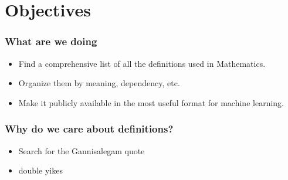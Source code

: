 \documentclass{beamer}
\begin{document}
\section{Objectives}
\begin{frame}
    \frametitle{What are we doing}
\begin{itemize}
\item Find a comprehensive list of all the definitions used in Mathematics.
\item Organize them by meaning, dependency, etc.
\item Make it publicly available in the most useful format for machine learning.
\end{itemize}
\end{frame}

\begin{frame}
\frametitle{Why do we care about definitions?}
\begin{itemize}
\item Search for the Gannisalegam quote
\item double yikes
\end{itemize}
\end{frame}
\end{document}

